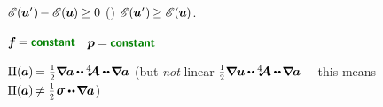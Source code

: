 \vspace{-0.2em}\noindent
{}
${{\mathscr{E}\hspace{-0.2ex}} \hspace{.16ex} (\hspace{-0.1ex}\bm{u}'\hspace{.1ex}) \hspace{-0.2ex} -
{\mathscr{E}\hspace{-0.2ex}} \hspace{.16ex} (\hspace{-0.1ex}\bm{u}\hspace{-0.1ex}) \hspace{-0.1ex} \geq 0}$
 () ${{\mathscr{E}\hspace{-0.2ex}} \hspace{.16ex} (\hspace{-0.1ex}\bm{u}'\hspace{.1ex}) \hspace{-0.2ex} \geq {\mathscr{E}\hspace{-0.2ex}} \hspace{.16ex} (\hspace{-0.1ex}\bm{u}\hspace{-0.1ex})}$.

${\bm{f} \hspace{-0.2ex} = \hspace{-0.1ex} \boldconstant}$ ~${\bm{p} \hspace{-0.1ex} = \hspace{-0.1ex} \boldconstant}$

${\potential(\hspace{-0.1ex}\bm{a}\hspace{-0.1ex}) \hspace{-0.2ex} = \hspace{.1ex} \smallerdisplaystyleonehalf \boldnabla \hspace{-0.1ex} \bm{a} \hspace{-0.1ex} \dotdotp \hspace{-0.1ex} \stiffnesstensor \dotdotp \hspace{-0.25ex} \boldnabla \hspace{-0.1ex} \bm{a}}$
(but \emph{not} linear ${\smallerdisplaystyleonehalf \boldnabla \bm{u} \hspace{-0.1ex} \dotdotp \hspace{-0.1ex} \stiffnesstensor \dotdotp \hspace{-0.25ex} \boldnabla \hspace{-0.1ex} \bm{a}}$\:--- this means ${\potential(\hspace{-0.1ex}\bm{a}\hspace{-0.1ex}) \hspace{-0.2ex} \neq \smallerdisplaystyleonehalf \hspace{.1ex} \linearstress \dotdotp \hspace{-0.25ex} \boldnabla \hspace{-0.1ex} \bm{a}}$)

